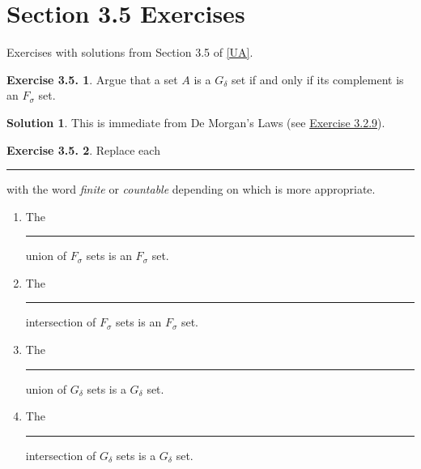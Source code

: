 \documentclass[12pt]{article}
\theoremstyle{definition}
\theoremstyle{exercise}
\newtheorem{exercise}{Exercise 3.5.}
\theoremstyle{solution}
\newtheorem*{solution}{Solution}
\begin{document}
\section{Section 3.5 Exercises}

Exercises with solutions from Section 3.5 of \hyperlink{ua}{[UA]}.

\begin{exercise}
\label{ex:1}
    Argue that a set \( A \) is a \( G_{\delta} \) set if and only if its complement is an \( F_{\sigma} \) set.
\end{exercise}

\begin{solution}
    This is immediate from De Morgan's Laws (see \href{https://lew98.github.io/Mathematics/UA_Section_3_2_Exercises.pdf}{Exercise 3.2.9}).
\end{solution}

\begin{exercise}
\label{ex:2}
    Replace each \rule{1cm}{0.15mm} with the word \textit{finite} or \textit{countable} depending on which is more appropriate.
    \begin{enumerate}
        \item The \rule{1cm}{0.15mm} union of \( F_{\sigma} \) sets is an \( F_{\sigma} \) set.

        \item The \rule{1cm}{0.15mm} intersection of \( F_{\sigma} \) sets is an \( F_{\sigma} \) set.

        \item The \rule{1cm}{0.15mm} union of \( G_{\delta} \) sets is a \( G_{\delta} \) set.

        \item The \rule{1cm}{0.15mm} intersection of \( G_{\delta} \) sets is a \( G_{\delta} \) set.
    \end{enumerate}
\end{exercise}
\end{document}
